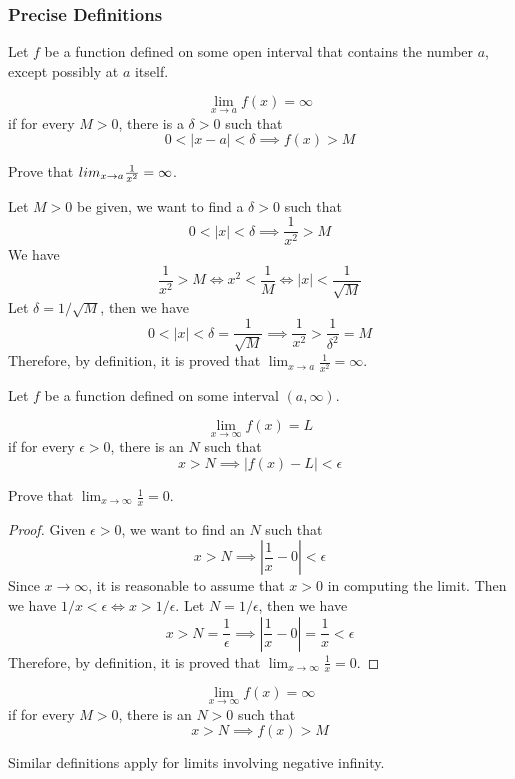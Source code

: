\subsubsection*{Precise Definitions}
Let \(f\) be a function defined on some open interval that contains the number
\(a\), except possibly at \(a\) itself.
\begin{definition}
    \[\lim_{x\to a}f(x)=\infty\]
    if for every \(M>0\), there is a
    \(\delta>0\) such that
    \[0<|x-a|<\delta\implies f(x)>M\]
\end{definition}
\begin{problem}
    Prove that \(\\lim_{x\to a}\frac{1}{x^2}=\infty\).
\end{problem}
\begin{solution}
    Let \(M>0\) be given, we want to find a \(\delta>0\) such that
    \[0<|x|<\delta\implies\frac{1}{x^2}>M\]
    We have
    \[\frac{1}{x^2}>M\iff x^2<\frac{1}{M}\iff|x|<\frac{1}{\sqrt{M}}\]
    Let \(\delta=1/\sqrt{M}\), then we have
    \[0<|x|<\delta=\frac{1}{\sqrt{M}}\implies\frac{1}{x^2}
    >\frac{1}{\delta^2}=M\]
    Therefore, by definition, it is proved that
    \(\displaystyle{\lim_{x\to a}\frac{1}{x^2}=\infty}\).
\end{solution}
Let \(f\) be a function defined on some interval \((a,\infty)\).
\begin{definition}
    \[\lim_{x\to \infty}f(x)=L\]
    if for every \(\epsilon>0\), there is an
    \(N\) such that
    \[x>N\implies|f(x)-L|<\epsilon\]
\end{definition}
\begin{problem}
    Prove that \(\lim_{x\to \infty}\frac{1}{x}=0\).
\end{problem}
\begin{proof}
    Given \(\epsilon>0\), we want to find an \(N\) such that
    \[x>N\implies\left|\frac{1}{x}-0\right|<\epsilon\]
    Since \(x\to \infty\), it is reasonable to assume that \(x>0\) in
    computing the limit.
    Then we have \(1/x<\epsilon\iff x>1/\epsilon\).
    Let \(N=1/\epsilon\), then we have
    \[x>N=\frac{1}{\epsilon}\implies\left|\frac{1}{x}-0\right|=\frac{1}{x}
    <\epsilon\]
    Therefore, by definition, it is proved that
    \(\displaystyle{\lim_{x\to \infty}\frac{1}{x}=0}\).
\end{proof}
\begin{definition}
    \[\lim_{x\to \infty}f(x)=\infty\] if for every \(M>0\), there is an
    \(N>0\) such that \[x>N\implies f(x)>M\]
\end{definition}
Similar definitions apply for limits involving negative infinity.